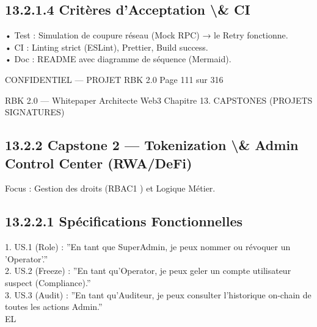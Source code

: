 \subsection{13.2.1.4 Critères d’Acceptation \textbackslash{}& CI}
\vspace{0.5em}
• Test : Simulation de coupure réseau (Mock RPC) → le Retry fonctionne.\\
\vspace{0.5em}
• CI : Linting strict (ESLint), Prettier, Build success.\\
\vspace{0.5em}
• Doc : README avec diagramme de séquence (Mermaid).\\
\vspace{0.5em}
\vspace{0.5em}
\vspace{0.5em}
\begin{confidential}CONFIDENTIEL — PROJET RBK 2.0                                 Page 111 sur 316\end{confidential}
RBK 2.0 — Whitepaper Architecte Web3                                                                        Chapitre 13. CAPSTONES (PROJETS SIGNATURES)\\
\vspace{0.5em}
\vspace{0.5em}
\subsection{13.2.2 Capstone 2 — Tokenization \textbackslash{}& Admin Control Center (RWA/DeFi)}
\vspace{0.5em}
Focus : Gestion des droits (RBAC1 ) et Logique Métier.\\
\vspace{0.5em}
\subsection{13.2.2.1 Spécifications Fonctionnelles}
\vspace{0.5em}
1. US.1 (Role) : ”En tant que SuperAdmin, je peux nommer ou révoquer un ’Operator’.”\\
\vspace{0.5em}
2. US.2 (Freeze) : ”En tant qu’Operator, je peux geler un compte utilisateur suspect (Compliance).”\\
\vspace{0.5em}
3. US.3 (Audit) : ”En tant qu’Auditeur, je peux consulter l’historique on-chain de toutes les actions Admin.”\\
\vspace{0.5em}
\vspace{0.5em}
\vspace{0.5em}
\vspace{0.5em}
EL\\

